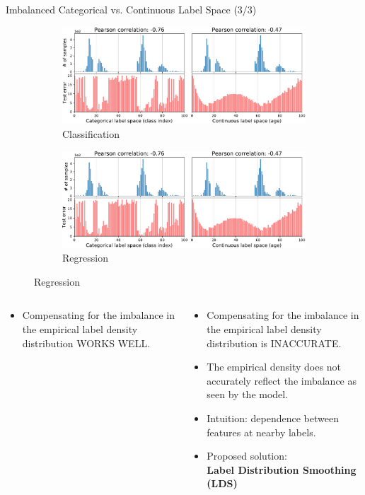 \begin{frame}{Imbalanced Categorical vs. Continuous Label Space (3/3)}
	\vspace{-0.4em}
	\begin{figure}[h]
		\begin{subfigure}{0.48\textwidth}
			\includegraphics[width=\linewidth]{images/err_motivate_1_left.pdf}
			\caption{Classification}
		\end{subfigure}\hspace{1em}%
		\begin{subfigure}{0.44\textwidth}
			\includegraphics[width=\linewidth]{images/err_motivate_1_right.pdf}
			\caption{Regression}
		\end{subfigure}
	\end{figure}
	\vspace{-1em}
	\begin{columns}
		\fontsize{7pt}{7.2}\selectfont
		\begin{column}{0.5\textwidth}
			\begin{itemize}
				\item Compensating for the imbalance in the empirical label
				density distribution WORKS WELL.
			\end{itemize}
		\end{column}
		\begin{column}{0.5\textwidth}
			\begin{itemize}\setlength\itemsep{.5em}
				\item Compensating for the imbalance in the empirical label
				density distribution is INACCURATE.
				\item The empirical density does not accurately reflect the imbalance as seen by the model.
				\item Intuition: dependence between features at nearby labels.
				\item Proposed solution: \\\textbf{Label Distribution Smoothing (LDS)}
			\end{itemize}
		\end{column}
	\end{columns}
\end{frame}

